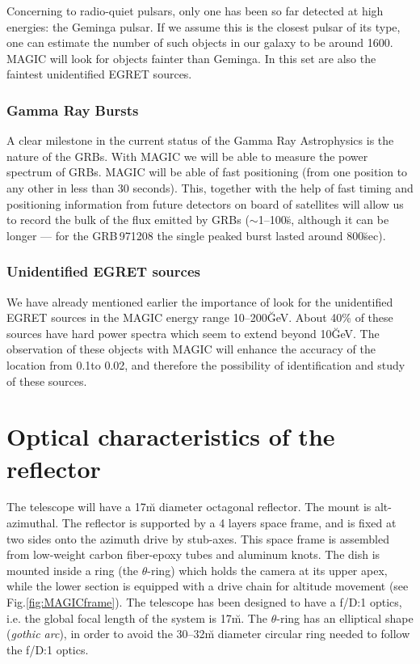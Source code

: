 Concerning to radio-quiet pulsars, only one has been so far detected
at high energies: the Geminga pulsar. If we assume this is the closest
pulsar of its type, one can estimate the number of such objects in our
galaxy to be around 1600. MAGIC will look for objects fainter than
Geminga. In this set are also the faintest unidentified EGRET sources.

\subsubsection*{Gamma Ray Bursts} 
%
A clear milestone in the current status of the Gamma Ray Astrophysics
is the nature of the GRBs. With MAGIC we will be able to measure the
power spectrum of GRBs. MAGIC will be able of fast positioning (from
one position to any other in less than 30 seconds).  This, together
with the help of fast timing and positioning information from future
detectors on board of satellites will allow us to record the bulk of
the flux emitted by GRBs ($\sim$1--100\u{s}, although it can be longer
--- for the GRB\,971208 the single peaked burst lasted around
800\u{sec}).

\subsubsection*{Unidentified EGRET sources} 
%
We have already mentioned earlier the importance of look for the
unidentified EGRET sources in the MAGIC energy range 10--200\u{GeV}.
About 40\% of these sources have hard power spectra which seem to
extend beyond 10\u{GeV}. The observation of these objects with MAGIC
will enhance the accuracy of the location from 0.1\deg to 0.02\deg,
and therefore the possibility of identification and study of these
sources.

\MAGICframefig

\section{Optical characteristics of the reflector}
%
The \MAGIC telescope will have a 17\u{m} diameter octagonal reflector.
The mount is alt-azimuthal. The reflector is supported by a 4 layers
space frame, and is fixed at two sides onto the azimuth drive by
stub-axes. This space frame is assembled from low-weight carbon
fiber-epoxy tubes and aluminum knots. The dish is mounted inside a
ring (the $\theta$-ring) which holds the camera at its upper apex,
while the lower section is equipped with a drive chain for altitude
movement (see Fig.\ref{fig:MAGICframe}).  The telescope has been
designed to have a f/D:1 optics, i.e. the global focal length of the
system is 17\u{m}.  The $\theta$-ring has an elliptical shape
(\emph{gothic arc}), in order to avoid the 30--32\u{m} diameter
circular ring needed to follow the f/D:1 optics.

